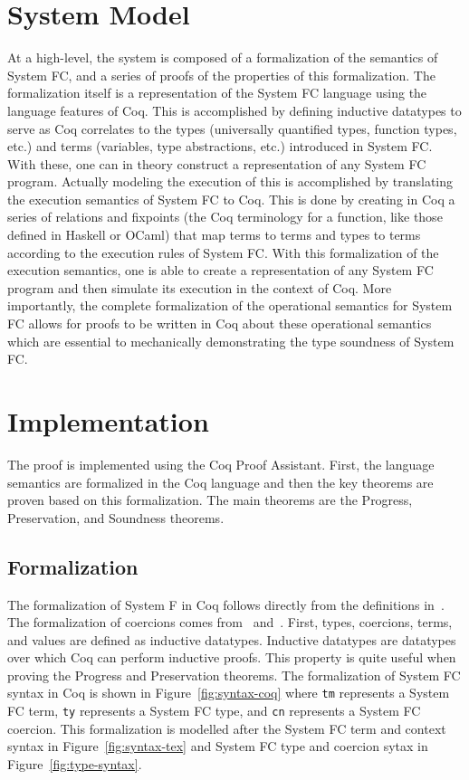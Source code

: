 \documentclass{sig-alternate}
\begin{document}
\section{System Model}
\label{sec:model}
At a high-level, the system is composed of a formalization of the semantics of System FC, and a series of proofs of the properties of this formalization. The formalization itself is a representation of the System FC language using the language features of Coq. This is accomplished by defining inductive datatypes to serve as Coq correlates to the types (universally quantified types, function types, etc.) and terms (variables, type abstractions, etc.) introduced in System FC.  With these, one can in theory construct a representation of any System FC program. Actually modeling the execution of this is accomplished by translating the execution semantics of System FC to Coq. This is done by creating in Coq a series of relations and fixpoints (the Coq terminology for a function, like those defined in Haskell or OCaml) that map terms to terms and types to terms according to the execution rules of System FC. With this formalization of the execution semantics, one is able to create a representation of any System FC program and then simulate its execution in the context of Coq. More importantly, the complete formalization of the operational semantics for System FC allows for proofs to be written in Coq about these operational semantics which are essential to mechanically demonstrating the type soundness of System FC.

\section{Implementation}
\label{sec:implementation}

The proof is implemented using the Coq Proof Assistant. First, the language semantics are formalized in the Coq language and then the key theorems are proven based on this formalization. The main theorems are the Progress, Preservation, and Soundness theorems.

\subsection{Formalization}
\label{sec:implementation-formalization}

The formalization of System F in Coq follows directly from the definitions in~\cite{Pierce:TAPL}. The formalization of coercions comes from~\cite{Breitner:2014:SZC:2628136.2628141} and~\cite{DBLP:conf/tldi/YorgeyWCJVM12}. First, types, coercions, terms, and values are defined as inductive datatypes. Inductive datatypes are datatypes over which Coq can perform inductive proofs. This property is quite useful when proving the Progress and Preservation theorems. The formalization of System FC syntax in Coq is shown in Figure~\ref{fig:syntax-coq} where \texttt{tm} represents a System FC term,  \texttt{ty} represents a System FC type, and \texttt{cn} represents a System FC coercion. This formalization is modelled after the System FC term and context syntax in Figure~\ref{fig:syntax-tex} and System FC type and coercion sytax in Figure~\ref{fig:type-syntax}.
\end{document}
